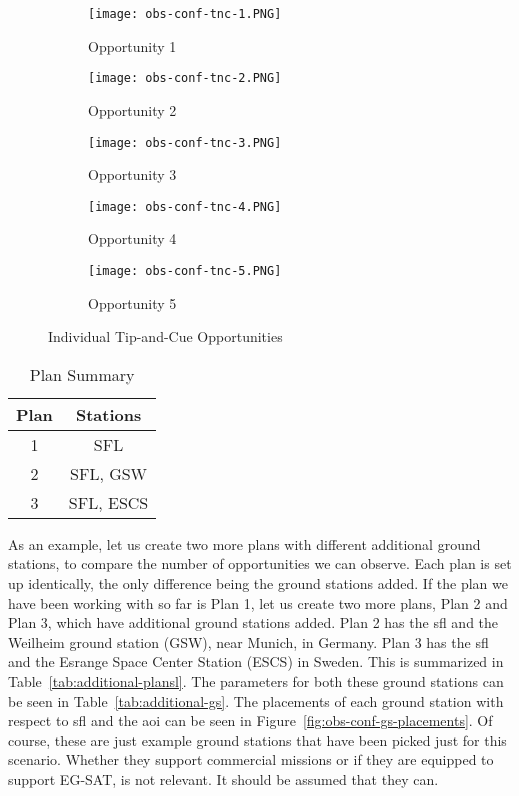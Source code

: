 \begin{figure}[h]
    \centering
    \begin{subfigure}[b]{0.3\textwidth}
	\centering
	\texttt{[image: obs-conf-tnc-1.PNG]} 
	\caption{Opportunity 1}
	\label{fig:obs-conf-tnc-1} 
    \end{subfigure}
    \hfill
    \begin{subfigure}[b]{0.3\textwidth}
	\centering
	\texttt{[image: obs-conf-tnc-2.PNG]} 
	\caption{Opportunity 2}
	\label{fig:obs-conf-tnc-2} 
    \end{subfigure}
    \hfill
    \begin{subfigure}[b]{0.3\textwidth}
	\centering
	\texttt{[image: obs-conf-tnc-3.PNG]} 
	\caption{Opportunity 3}
	\label{fig:obs-conf-tnc-3} 
    \end{subfigure}
    
    \begin{subfigure}[b]{0.3\textwidth}
	\centering
	\texttt{[image: obs-conf-tnc-4.PNG]} 
	\caption{Opportunity 4}
	\label{fig:obs-conf-tnc-4} 
    \end{subfigure}
    \quad \quad
    \begin{subfigure}[b]{0.3\textwidth}
	\centering
	\texttt{[image: obs-conf-tnc-5.PNG]} 
	\caption{Opportunity 5}
	\label{fig:obs-conf-tnc-5} 
    \end{subfigure}

    \caption{Individual Tip-and-Cue Opportunities}
\label{fig:obs-conf-tnc-opps}
\end{figure}

\begin{table}[h] 
    \centering
    \caption{Plan Summary}
    \begin{tabular}{cc}
	Plan & Stations \\ \hline
	1   &	SFL \\
	2   &	SFL, GSW \\
	3   &	SFL, ESCS 
    \end{tabular}
    \label{tab:additional-plans}
\end{table}

As an example, let us create two more plans with different additional ground
stations, to compare the number of opportunities we can observe. Each plan is
set up identically, the only difference being the ground stations added. If the
plan we have been working with so far is Plan 1, let us create two more plans,
Plan 2 and Plan 3, which have additional ground stations added.  Plan 2 has the
\gls{sfl} and the Weilheim ground station (GSW), near Munich, in Germany. Plan
3 has the \gls{sfl} and the Esrange Space Center Station (ESCS) in Sweden. This
is summarized in Table~\ref{tab:additional-plansl}. The parameters for both
these ground stations can be seen in Table~\ref{tab:additional-gs}. The
placements of each ground station with respect to \gls{sfl} and the \gls{aoi}
can be seen in Figure~\ref{fig:obs-conf-gs-placements}. Of course, these are
just example ground stations that have been picked just for this scenario.
Whether they support commercial missions or if they are equipped to support
EG-SAT, is not relevant. It should be assumed that they can. 

